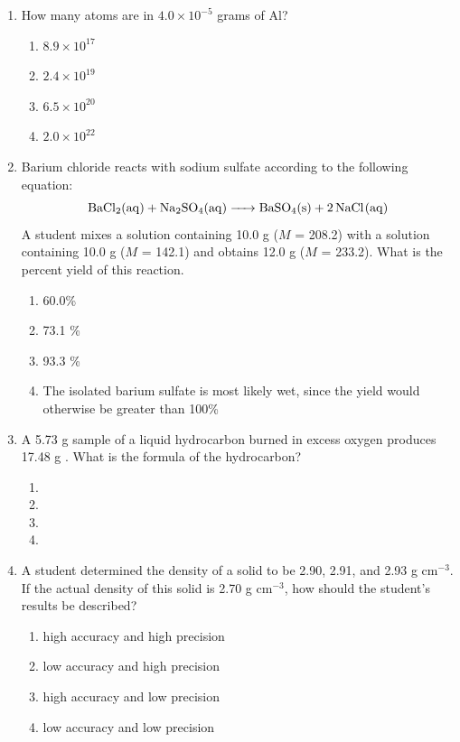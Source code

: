 \documentclass[11pt, leqno]{article}
\begin{document}
\newpage
\begin{enumerate}[leftmargin = *]
\item How many atoms are in $4.0 \times 10^{-5}$ grams of Al?
\begin{enumerate}
    \item $8.9 \times 10^{17}$
    \item $2.4 \times 10^{19}$
    \item $6.5 \times 10^{20}$
    \item $2.0 \times 10^{22}$
\end{enumerate}

\item Barium chloride reacts with sodium sulfate according to the following equation:
    $$\ce{BaCl2(aq) + Na2SO4(aq) -> BaSO4(s) + 2NaCl(aq)}$$
A student mixes a solution containing 10.0 g  ($M$ = 208.2) with a solution containing 10.0 g  ($M$ = 142.1) and obtains 12.0 g  ($M$ = 233.2). What is the percent yield of this reaction.
\begin{enumerate}
\item 60.0\%
\item 73.1 \%
\item 93.3 \%
\item The isolated barium sulfate is most likely wet, since the yield would otherwise be greater than 100\%
\end{enumerate}
\item A 5.73 g sample of a liquid hydrocarbon burned in excess oxygen produces 17.48 g . What is the formula of the hydrocarbon?
\begin{enumerate}
    \item {}
    \item {}
    \item {}
    \item {}
\end{enumerate}
\item A student determined the density of a solid to be 2.90, 2.91, and 2.93 g cm$^{-3}$. If the actual density of this solid is 2.70 g cm$^{-3}$, how should the student's results be described?
\begin{enumerate}
    \item high accuracy and high precision
    \item low accuracy and high precision
    \item high accuracy and low precision
    \item low accuracy and low precision

\end{enumerate}
\end{enumerate}
\end{document}
